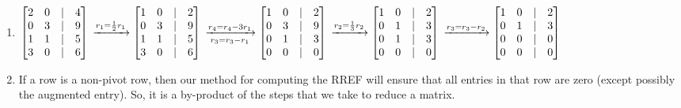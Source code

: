 \documentclass{article}
\begin{document}
\begin{enumerate}
	\item $
	\begin{bmatrix}
		2	&0	&|	&4\\
		0	&3	&|	&9\\
		1	&1	&|	&5\\
		3	&0	&|	&6
	\end{bmatrix}\\
	\xrightarrow[]{r_1=\frac{1}{2}r_1}
	\begin{bmatrix}
		1	&0	&|	&2\\
		0	&3	&|	&9\\
		1	&1	&|	&5\\
		3	&0	&|	&6
	\end{bmatrix}\\
	\xrightarrow[r_3=r_3-r_1]{r_4=r_4-3r_1}
	\begin{bmatrix}
		1	&0	&|	&2\\
		0	&3	&|	&9\\
		0	&1	&|	&3\\
		0	&0	&|	&0
	\end{bmatrix}\\
	\xrightarrow[]{r_2=\frac{1}{3}r_2}
	\begin{bmatrix}
		1	&0	&|	&2\\
		0	&1	&|	&3\\
		0	&1	&|	&3\\
		0	&0	&|	&0
	\end{bmatrix}\\	
	\xrightarrow[]{r_3=r_3-r_2}
	\begin{bmatrix}
		1	&0	&|	&2\\
		0	&1	&|	&3\\
		0	&0	&|	&0\\
		0	&0	&|	&0
	\end{bmatrix}\\	
	$
	
	\item If a row is a non-pivot row, then our method for computing the RREF will ensure that all entries in that row are zero (except possibly the augmented entry). So, it is a by-product of the steps that we take to reduce a matrix.
	

\end{enumerate}
\end{document}
